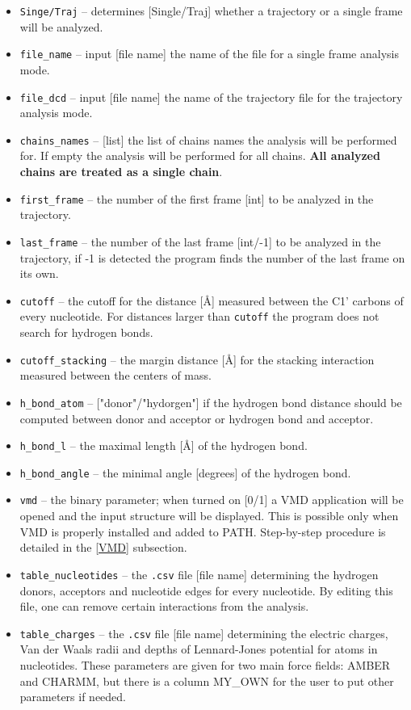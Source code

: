 \documentclass[12pt]{article}
\begin{document}
\begin{itemize}
\item \texttt{Singe/Traj} -- determines [Single/Traj] whether a trajectory or a single frame will be analyzed. 
\item \texttt{file\_name} -- input [file name] the name of the file for a single frame analysis mode.
\item \texttt{file\_dcd} -- input [file name] the name of the trajectory file for the trajectory analysis mode.
\item \texttt{chains\_names} -- [list] the list of chains names the analysis will be performed for. If empty the analysis will be performed for all chains.\textbf{ All analyzed chains are treated as a single chain}.
\item \texttt{first\_frame} -- the number of the first frame [int] to be analyzed in the trajectory.
\item \texttt{last\_frame} -- the number of the last frame [int/-1] to be analyzed in the trajectory, if -1 is detected the program finds the number of the last frame on its own.
\item \texttt{cutoff} -- the cutoff for the distance [\AA] measured between the  C1' carbons of every nucleotide. For distances larger than \texttt{cutoff} the program does not search for hydrogen bonds.
\item \texttt{cutoff\_stacking} -- the margin distance [\AA] for the stacking interaction measured between the centers of mass. 
\item \texttt{h\_bond\_atom} -- ["donor"/"hydorgen"] if the hydrogen bond distance should be computed between donor and acceptor or hydrogen bond and acceptor.
\item \texttt{h\_bond\_l} -- the maximal length [\AA] of the hydrogen bond.
\item \texttt{h\_bond\_angle}  -- the minimal angle [degrees] of the hydrogen bond.
\item \texttt{vmd} -- the binary parameter; when turned on [0/1] a VMD application will be opened and the input structure will be displayed. This is possible only when VMD is properly installed and added to PATH. Step-by-step procedure is detailed in the \ref{VMD} subsection.
\item \texttt{table\_nucleotides} -- the \texttt{.csv} file  [file name] determining the hydrogen donors, acceptors and nucleotide edges for every nucleotide. By editing this file, one can remove certain interactions from the analysis.
\item \texttt{table\_charges}  -- the \texttt{.csv} file  [file name] determining the electric charges, Van der Waals radii and depths of Lennard-Jones potential for atoms in nucleotides. These parameters are given for  two main force fields: AMBER and CHARMM, but there is a column MY\_OWN for the user to put other parameters if needed.

\end{itemize}
\end{document}
